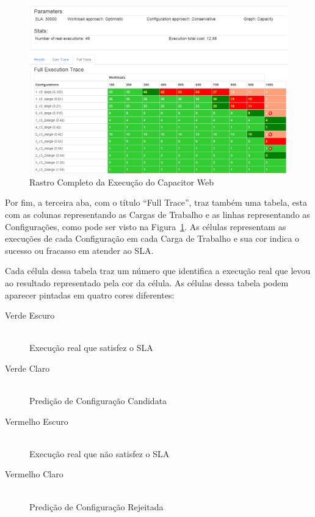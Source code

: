 \begin{figure}[htb]
  \begin{center}
    \includegraphics[scale=0.5]{img/CapacitorWeb_FullTrace}
  \end{center}
  \caption{\label{fig:capacitor_web_fulltrace}Rastro Completo da Execução do Capacitor Web}
\end{figure}

Por fim, a terceira aba, com o título ``Full Trace'', traz também uma tabela, 
esta com as colunas representando as Cargas de Trabalho e as linhas representando
as Configurações, como pode ser visto na Figura~\ref{fig:capacitor_web_fulltrace}. 
As células representam as execuções de cada Configuração em cada Carga de Trabalho 
e sua cor indica o sucesso ou fracasso em atender ao SLA.

Cada célula dessa tabela traz um número que identifica a execução real que levou
ao resultado representado pela cor da célula. As células dessa tabela podem aparecer
pintadas em quatro cores diferentes:

\begin{description}
  \item[Verde Escuro] \hfill \\ Execução real que satisfez o SLA
  \item[Verde Claro] \hfill \\ Predição de Configuração Candidata
  \item[Vermelho Escuro] \hfill \\ Execução real que não satisfez o SLA
  \item[Vermelho Claro] \hfill \\ Predição de Configuração Rejeitada
\end{description}

